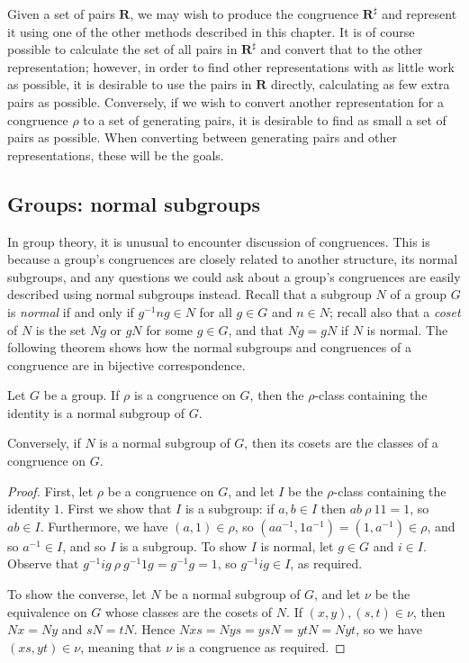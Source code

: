 Given a set of pairs $\mathbf{R}$, we may wish to produce the congruence
$\mathbf{R}^\sharp$ and represent it using one of the other methods described in
this chapter.  It is of course possible to calculate the set of all pairs in
$\mathbf{R}^\sharp$ and convert that to the other representation; however, in
order to find other representations with as little work as possible, it is
desirable to use the pairs in $\mathbf{R}$ directly, calculating as few extra
pairs as possible.  Conversely, if we wish to convert another representation for
a congruence $\rho$ to a set of generating pairs, it is desirable to find as
small a set of pairs as possible.  When converting between generating pairs and
other representations, these will be the goals.

\subsection{Groups: normal subgroups}
\label{sec:normal-subgroups}

In group theory, it is unusual to encounter discussion of congruences.  This is
because a group's congruences are closely related to another structure, its
normal subgroups, and any questions we could ask about a group's congruences are
easily described using normal subgroups instead.  Recall that a subgroup $N$ of
a group $G$ is \textit{normal} if and only if $g^{-1}ng \in N$ for all $g \in G$
and $n \in N$; recall also that a \textit{coset} of $N$ is the set $Ng$ or $gN$
for some $g \in G$, and that $Ng=gN$ if $N$ is normal.  The following theorem
shows how the normal subgroups and congruences of a congruence are in bijective
correspondence.

\begin{theorem}
  \label{thm:normal-subgroups}
  Let $G$ be a group.  If $\rho$ is a congruence on $G$, then the $\rho$-class
  containing the identity is a normal subgroup of $G$.

  Conversely, if $N$ is a normal subgroup of $G$, then its cosets are the
  classes of a congruence on $G$.

  \begin{proof}
    First, let $\rho$ be a congruence on $G$, and let $I$ be the $\rho$-class
    containing the identity $1$.  First we show that $I$ is a subgroup: if
    $a,b \in I$ then $ab ~\rho~ 11 = 1$, so $ab \in I$.
    Furthermore, we have $(a,1) \in \rho$, so
    $(aa^{-1}, 1a^{-1}) = (1, a^{-1}) \in \rho$, and so $a^{-1} \in I$, and so
    $I$ is a subgroup.  To show $I$ is normal, let $g \in G$ and $i \in I$.
    Observe that $g^{-1}ig ~\rho~ g^{-1}1g = g^{-1}g = 1$, so $g^{-1}ig \in I$,
    as required.

    To show the converse, let $N$ be a normal subgroup of $G$, and let $\nu$ be
    the equivalence on $G$ whose classes are the cosets of $N$.  If
    $(x,y), (s,t) \in \nu$, then $Nx=Ny$ and $sN=tN$.  Hence
    $Nxs=Nys=ysN=ytN=Nyt$, so we have $(xs,yt) \in \nu$, meaning that $\nu$ is
    a congruence as required.
  \end{proof}
\end{theorem}

